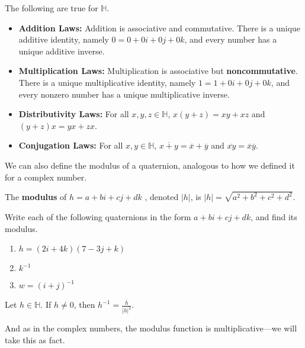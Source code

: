 \begin{fact}\label{fact.QuaternionLaws} The following are true for $\mathbb{H}$.
\begin{itemize}
\item \textbf{Addition Laws:} Addition is associative and commutative. There is a unique additive identity, namely $0 = 0 + 0i+0j+0k$, and every number has a unique additive inverse.
\item \textbf{Multiplication Laws:} Multiplication is associative but \textbf{noncommutative}. There is a unique multiplicative identity, namely $1 = 1 + 0i+0j+0k$, and every nonzero number has a unique multiplicative inverse.
\item \textbf{Distributivity Laws:} For all $x,y,z \in \mathbb{H}$, $x(y+z) = xy+xz$ and $(y+z)x = yx+zx$.
\item \textbf{Conjugation Laws:} For all $x,y \in \mathbb{H}$, $\overline{x+y} = \overline{x} + \overline{y}$ and $\overline{xy} = \overline{x}\overline{y}$.
\end{itemize}
\end{fact}

We can also define the modulus of a quaternion, analogous to how we defined it for a complex number.

\begin{definition}
The \textbf{modulus} of $h=a + bi+ cj + dk$ , denoted $|h|$, is $|h| = \sqrt{a^2 + b^2+c^2+d^2}$. 
\end{definition}

\begin{problem}\label{prob.QuaternionCheckin}
Write each of the following quaternions in the form $a+bi+cj+dk$, and find its modulus.
\begin{multicols}{2}
\begin{enumerate}
\item $h = (2i+4k)(7-3j+k)$
\item $k^{-1}$
\item $w = (i+j)^{-1}$
\end{enumerate}
\end{multicols}
\end{problem}

\begin{theorem}
Let $h\in \mathbb{H}$. If $h\neq 0$, then $h^{-1} = \displaystyle\frac{\overline{h}}{|h|^2}$.
\end{theorem}

And as in the complex numbers, the modulus function is multiplicative---we will take this as fact.

